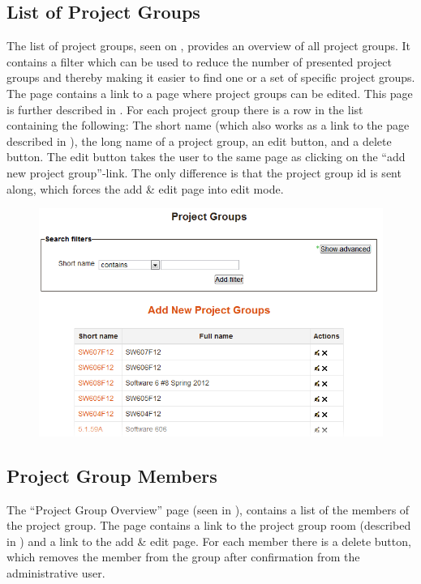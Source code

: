 \subsection{List of Project Groups}
\label{sec:preListPg}
The list of project groups, seen on , provides an overview of all project groups. 
It contains a filter which can be used to reduce the number of presented project groups and thereby making it easier to find one or a set of specific project groups. 
The page contains a link to a page where project groups can be edited. 
This page is further described in .
For each project group there is a row in the list containing the following: The short name (which also works as a link to the page described in ), the long name of a project group, an edit button, and a delete button. 
The edit button takes the user to the same page as clicking on the ``add new project group''-link. 
The only difference is that the project group id is sent along, which forces the add \& edit page into edit mode. 

\begin{figure}
	\centering
		\includegraphics[width=\textwidth]{images/moodleadminprojectgrouplist.png}

		\label{fig:moodleadouplist}
\end{figure}


\FloatBarrier

\subsection{Project Group Members}
\label{sec:projectGrpMem}
The ``Project Group Overview'' page (seen in ), contains a list of the members of the project group. 
The page contains a link to the project group room (described in ) and a link to the add \& edit page. 
For each member there is a delete button, which removes the member from the group after confirmation from the administrative user.


